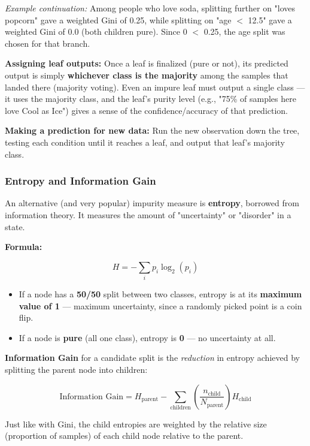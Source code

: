 \documentclass[12pt,openany]{book}
\begin{document}
\textit{Example continuation:} Among people who love soda, splitting further on "loves popcorn" gave a weighted Gini of 0.25, while splitting on "age \(<\) 12.5" gave a weighted Gini of 0.0 (both children pure). Since 0 \(<\) 0.25, the age split was chosen for that branch.

\textbf{Assigning leaf outputs:} Once a leaf is finalized (pure or not), its predicted output is simply \textbf{whichever class is the majority} among the samples that landed there (majority voting). Even an impure leaf must output a single class --- it uses the majority class, and the leaf's purity level (e.g., "75\% of samples here love Cool as Ice") gives a sense of the confidence/accuracy of that prediction.

\textbf{Making a prediction for new data:} Run the new observation down the tree, testing each condition until it reaches a leaf, and output that leaf's majority class.

\subsubsection{Entropy and Information Gain}


An alternative (and very popular) impurity measure is \textbf{entropy}, borrowed from information theory. It measures the amount of "uncertainty" or "disorder" in a state.

\textbf{Formula:}

\[
H = -\sum_i p_i \log_2(p_i)
\]


\begin{itemize}[leftmargin=*]
    \item If a node has a \textbf{50/50} split between two classes, entropy is at its \textbf{maximum value of 1} --- maximum uncertainty, since a randomly picked point is a coin flip.
    \item If a node is \textbf{pure} (all one class), entropy is \textbf{0} --- no uncertainty at all.

\end{itemize}

\textbf{Information Gain} for a candidate split is the \textit{reduction} in entropy achieved by splitting the parent node into children:

\[
\text{Information Gain} = H_{\text{parent}} - \sum_{\text{children}} \left(\frac{n_{\text{child}}}{N_{\text{parent}}}\right) H_{\text{child}}
\]


Just like with Gini, the child entropies are weighted by the relative size (proportion of samples) of each child node relative to the parent.
\end{document}
